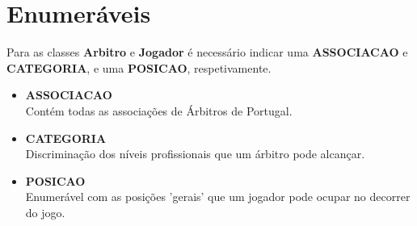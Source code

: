 \chapter{Enumeráveis}
Para as classes \textbf{Arbitro} e \textbf{Jogador} é necessário indicar uma \textbf{ASSOCIACAO} e \textbf{CATEGORIA},
e uma \textbf{POSICAO}, respetivamente.\\
\begin{itemize}
	\item \textbf{ASSOCIACAO}\\
	Contém todas as associações de Árbitros de Portugal.\\
	\item \textbf{CATEGORIA}\\
	Discriminação dos níveis profissionais que um árbitro pode alcançar.\\
	\item \textbf{POSICAO}\\
	Enumerável com as posições 'gerais' que um jogador pode ocupar no decorrer do jogo.
\end{itemize}